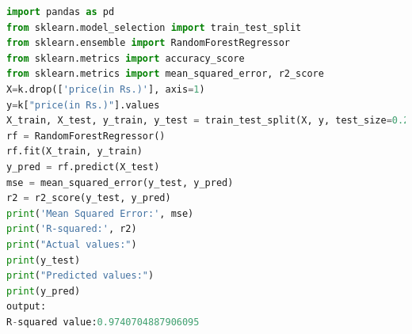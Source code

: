 \begin{lstlisting}[language=Python]
import pandas as pd
from sklearn.model_selection import train_test_split
from sklearn.ensemble import RandomForestRegressor
from sklearn.metrics import accuracy_score
from sklearn.metrics import mean_squared_error, r2_score
X=k.drop(['price(in Rs.)'], axis=1)
y=k["price(in Rs.)"].values
X_train, X_test, y_train, y_test = train_test_split(X, y, test_size=0.2, random_state=42)
rf = RandomForestRegressor()
rf.fit(X_train, y_train)
y_pred = rf.predict(X_test)
mse = mean_squared_error(y_test, y_pred)
r2 = r2_score(y_test, y_pred)
print('Mean Squared Error:', mse)
print('R-squared:', r2)
print("Actual values:")
print(y_test)
print("Predicted values:")
print(y_pred)
output:
R-squared value:0.9740704887906095
\end{lstlisting}





